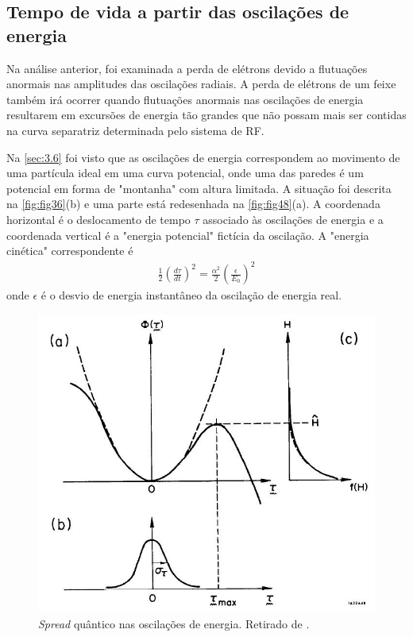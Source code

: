 \subsection{Tempo de vida a partir das oscilações de energia}
Na análise anterior, foi examinada a perda de elétrons devido a flutuações anormais nas amplitudes das oscilações radiais. A perda de elétrons de um feixe também irá ocorrer quando flutuações anormais nas oscilações de energia resultarem em excursões de energia tão grandes que não possam mais ser contidas na curva separatriz determinada pelo sistema de RF.

Na \autoref{sec:3.6} foi visto que as oscilações de energia correspondem ao movimento de uma partícula ideal em uma curva potencial, onde uma das paredes é um potencial em forma de "montanha" com altura limitada. A situação foi descrita na \autoref{fig:fig36}(b) e uma parte está redesenhada na \autoref{fig:fig48}(a). A coordenada horizontal é o deslocamento de tempo $\tau$ associado às oscilações de energia e a coordenada vertical é a "energia potencial" fictícia da oscilação. A "energia cinética" correspondente é
\begin{align}
	\frac{1}{2}\left(\frac{d\tau}{dt}\right)^2 = \frac{\alpha^2}{2}\left(\frac{\epsilon}{E_0}\right)^2\label{eq:5.131}
\end{align}
onde $\epsilon$ é o desvio de energia instantâneo da oscilação de energia real.

\begin{figure}[!htb]
	\centering
	\includegraphics[width=0.6\linewidth]{./Figuras/fig48.jpeg}
	\caption{\textit{Spread} quântico nas oscilações de energia. Retirado de \cite{sands1970physics}.}
	\label{fig:fig48}
\end{figure}

